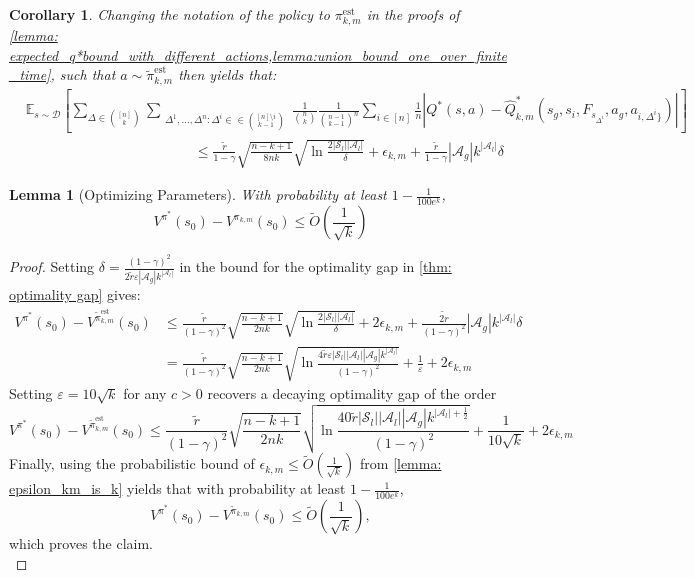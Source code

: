 \documentclass{article}
\theoremstyle{plain}
\newtheorem{lemma}[theorem]{Lemma}
\newtheorem{corollary}[theorem]{Corollary}
\theoremstyle{definition}
\def\est{\mathrm{est}}
\begin{document}
\begin{corollary}\label{pde_intermediary_bound_part_2}
  Changing the notation of the policy to ${\pi}_{k,m}^\est$ in the proofs of \cref{lemma: expected_q*bound_with_different_actions,lemma:union_bound_one_over_finite_time}, such that $a\sim \tilde{\pi}_{k,m}^\est$ then yields that:
    \begin{align*}
&\mathbb{E}_{s\sim \mathcal{D}}\left[\sum_{\Delta\in {[n]\choose k}}\sum_{\substack{\Delta^1,\dots,\Delta^n: \Delta^i \in \in {[n]\setminus i \choose k-1}}} \frac{1}{{n\choose k}}\frac{1}{{n-1 \choose k-1}^n}\sum_{i\in[n]}\frac{1}{n}\left|Q^*(s, a) - \hat{Q}^*_{k,m}(s_g, s_{i}, F_{s_{\Delta^i}}, a_g,a_{i,\Delta^i\}})\right|\right]\\
&\quad\quad\quad\quad\quad\quad\quad\quad \quad\quad\quad\quad \leq \frac{\tilde{r}}{1-\gamma}\sqrt{\frac{n-k+1}{8nk}} \sqrt{\ln\frac{2|\mathcal{S}_l||\mathcal{A}_l|}{\delta}}  +\epsilon_{k,m} + \frac{\tilde{r}}{1-\gamma}|\mathcal{A}_g|k^{|\mathcal{A}_l|}\delta
\end{align*}
\end{corollary}


\begin{lemma}[Optimizing Parameters]\label{lemma: parameter_optimization} With probability at least $1 - \frac{1}{100 e^k}$,
\[V^{\pi^*}(s_0) - V^{{\pi}_{k,m}}(s_0) \leq \tilde{O}\left(\frac{1}{\sqrt{k}}\right)\]
\end{lemma}
\begin{proof} 
    Setting $\delta = \frac{(1-\gamma)^2}{2\tilde{r}\varepsilon|\mathcal{A}_g|k^{|\mathcal{A}_l|}}$ in the bound for the optimality gap in \cref{thm: optimality gap} gives:
    \begin{align*}V^{\pi^*}(s_0) - V^{\tilde{\pi}_{k,m}^\est}(s_0) &\leq \frac{\tilde{r}}{(1-\gamma)^2}\sqrt{\frac{n-k+1}{2nk}} \sqrt{\ln\frac{2|\mathcal{S}_l||\mathcal{A}_l|}{\delta}}  + 2\epsilon_{k,m} +  \frac{\tilde{2r}}{(1-\gamma)^2}|\mathcal{A}_g|k^{|\mathcal{A}_l|}\delta \\
    &= \frac{\tilde{r}}{(1-\gamma)^2}\sqrt{\frac{n-k+1}{2nk}} \sqrt{\ln\frac{4\tilde{r}\varepsilon|\mathcal{S}_l||\mathcal{A}_l||\mathcal{A}_g|k^{|\mathcal{A}_l|}}{(1-\gamma)^2}}  + \frac{1}{\varepsilon} + 2\epsilon_{k,m}
    \end{align*}
Setting $\varepsilon = 10\sqrt{k}$ for any $c>0$ recovers a decaying optimality gap of the order
\[V^{\pi^*}(s_0) - V^{\tilde{\pi}_{k,m}^\est}(s_0) \leq \frac{\tilde{r}}{(1-\gamma)^2}\sqrt{\frac{n-k+1}{2nk}} \sqrt{\ln\frac{40\tilde{r}|\mathcal{S}_l||\mathcal{A}_l||\mathcal{A}_g|k^{|\mathcal{A}_l|+\frac{1}{2}}}{(1-\gamma)^2}}  + \frac{1}{10\sqrt{k}} + 2\epsilon_{k,m}\]
Finally, using the probabilistic bound of $\epsilon_{k,m} \leq \tilde{O}(\frac{1}{\sqrt{k}})$ from \cref{lemma: epsilon_km_is_k} yields that with probability at least $1 - \frac{1}{100e^k}$, \[V^{\pi^*}(s_0) - V^{\tilde{\pi}_{k,m}}(s_0) \leq \tilde{O}\left(\frac{1}{\sqrt{k}}\right),\]
which proves the claim.\qedhere \\
\end{proof}
\end{document}
